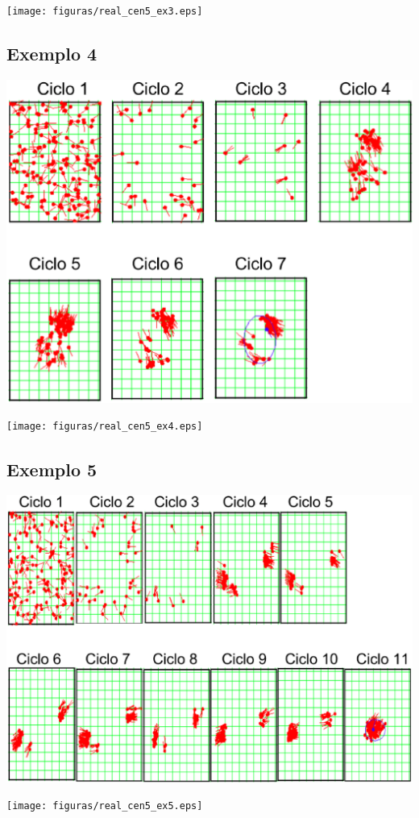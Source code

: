 {\centering
\texttt{[image: figuras/real\_cen5\_ex3.eps]}
\label{img:real_cen5_ex3}
\par}

\subsection{Exemplo 4}

{\centering
\includegraphics[scale=0.4]{figuras/cen5_ex4.eps}
\label{img:cen5_ex4}
\par}

{\centering
\texttt{[image: figuras/real\_cen5\_ex4.eps]}
\label{img:real_cen5_ex4}
\par}

\subsection{Exemplo 5}

{\centering
\includegraphics[scale=0.4]{figuras/cen5_ex5.eps}
\label{img:cen5_ex5}
\par}

{\centering
\texttt{[image: figuras/real\_cen5\_ex5.eps]}
\label{img:real_cen5_ex5}
\par}
